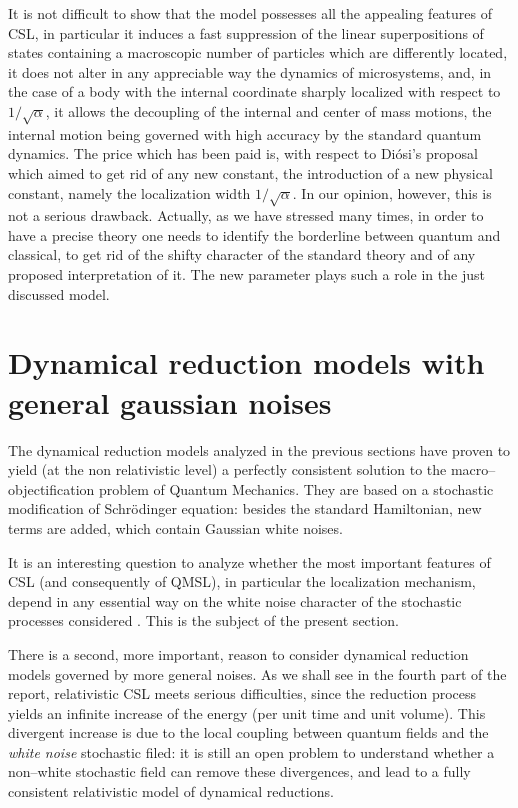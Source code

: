 \documentclass[12pt]{article}
\begin{document}
It is not difficult to show that  the model possesses all the
appealing features of CSL, in particular it induces a fast
suppression of the linear superpositions of states containing a
macroscopic number of particles which are differently located, it
does not alter in any appreciable way the dynamics of
microsystems, and, in the case of a body with the internal
coordinate sharply localized with respect to $1/\sqrt{\alpha}$, it
allows the decoupling of the internal and center of mass motions,
the internal motion being governed with high accuracy by the
standard quantum dynamics. The price which has been paid is, with
respect to Di\'osi's proposal which aimed to get rid of any new
constant, the introduction of a new physical constant, namely the
localization width $1/\sqrt{\alpha}$. In our opinion, however,
this is not a serious drawback. Actually, as we have stressed many
times, in order to have a precise theory one needs to identify the
borderline between quantum and classical, to get rid of the shifty
character of the standard theory and of any proposed
interpretation of it. The new parameter plays such a role in the
just discussed model.



\section{Dynamical reduction models with general gaussian noises}
\label{nsec}

The dynamical reduction models analyzed in the previous sections
have proven to yield (at the non relativistic level) a perfectly
consistent solution to the macro--objectification problem of
Quantum Mechanics. They are based on a stochastic modification of
Schr\"odinger equation: besides the standard Hamiltonian, new
terms are added, which contain Gaussian white noises.

It is an interesting question to analyze whether the most
important features of CSL (and consequently of QMSL), in
particular the localization mechanism, depend in any essential way
on the white noise character of the stochastic processes
considered \cite{pero, p1wq, gi2wq, gi2}. This is the subject of
the present section.

There is a second, more important, reason to consider dynamical
reduction models governed by more general noises. As we shall see
in the fourth part of the report, relativistic CSL meets serious
difficulties, since the reduction process yields an infinite
increase of the energy (per unit time and unit volume). This
divergent increase is due to the local coupling between quantum
fields and the {\it white noise} stochastic filed: it is still an
open problem to understand whether a non--white stochastic field
can remove these divergences, and lead to a fully consistent
relativistic model of dynamical reductions.
\end{document}
